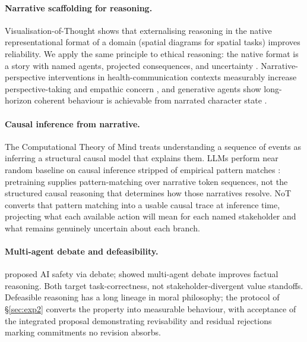 \documentclass[11pt]{article}
\begin{document}
\paragraph{Narrative scaffolding for reasoning.}
Visualisation-of-Thought \citep{wu24_vot} shows that externalising
reasoning in the native representational format of a domain (spatial
diagrams for spatial tasks) improves reliability. We apply the same
principle to ethical reasoning: the native format is a story with
named agents, projected consequences, and uncertainty
\citep{macintyre81, bruner86}. Narrative-perspective interventions in
health-communication contexts measurably increase perspective-taking
and empathic concern
\citep{shaffer19, bientzle21, bientzle24}, and generative agents show
long-horizon coherent behaviour is achievable from narrated character
state \citep{park23}.

\paragraph{Causal inference from narrative.} The Computational Theory
of Mind \citep{fodor75, putnam67} treats understanding a sequence of
events as inferring a structural causal model that explains them. LLMs
perform near random baseline on causal inference stripped of empirical
pattern matches \citep{jin23}: pretraining supplies pattern-matching
over narrative token sequences, not the structured causal reasoning
that determines how those narratives resolve. NoT converts that
pattern matching into a usable causal trace at inference time,
projecting what each available action will mean for each named
stakeholder and what remains genuinely uncertain about each branch.

\paragraph{Multi-agent debate and defeasibility.}
\citet{irving18} proposed AI safety via debate; \citet{du23} showed
multi-agent debate improves factual reasoning. Both target
task-correctness, not stakeholder-divergent value standoffs. Defeasible
reasoning \citep{pollock87, macintyre81} has a long lineage in moral
philosophy; the protocol of \S\ref{sec:exp2} converts the property into
measurable behaviour, with acceptance of the integrated proposal
demonstrating revisability and residual rejections marking commitments
no revision absorbs.
\end{document}
